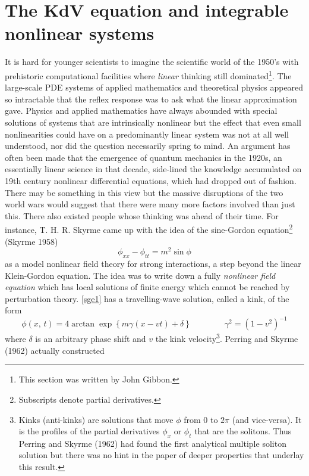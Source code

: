 \documentclass[11pt]{article}
\newcommand{\bel}{\begin{equation}\label}
\newcommand{\ee}{\end{equation}}
\begin{document}
\section{\large The KdV equation and integrable nonlinear systems}\label{sect:KdV}

It is hard for younger scientists to imagine the scientific world of the 1950's with prehistoric computational facilities 
where \textit{linear} thinking still dominated\footnote{This section was written by John Gibbon.}. The large-scale PDE 
systems of applied mathematics and theoretical physics appeared so intractable that the reflex response was to ask what 
the linear approximation gave. Physics and applied mathematics have always abounded with special solutions of systems 
that are intrinsically nonlinear but the effect that even small nonlinearities could have on a predominantly linear 
system was not at all well understood, nor did the question necessarily spring to mind.  An argument has often been 
made that the emergence of quantum mechanics in the 1920s, an essentially linear science in that decade, side-lined 
the knowledge accumulated on 19th century nonlinear differential equations, which had dropped out of fashion. There 
may be something in this view but the massive disruptions of the two world wars would 
suggest that there were many more factors involved than just this. There also existed people whose thinking was ahead of 
their time. For instance, T. H. R. Skyrme came up with the idea of the sine-Gordon equation\footnote{Subscripts denote 
partial derivatives.} (Skyrme 1958) 
\bel{sge1}
\phi_{xx} - \phi_{tt} = m^{2}\sin\phi
\ee
as a model nonlinear field theory for strong interactions, a step beyond the linear Klein-Gordon equation. The idea was 
to write down a fully \textit{nonlinear field equation} which has local solutions of finite energy which cannot be reached 
by perturbation theory. \eqref{sge1} has a travelling-wave solution, called a kink, of the form
\bel{sge2}
\phi (x,\,t) = 4\arctan \exp \left\{{m\gamma (x-vt)+\delta}\right\} \qquad\qquad \gamma ^{2}= (1-v^{2})^{-1}
\ee
where $\delta$ is an arbitrary phase shift and $v$ the kink velocity\footnote{Kinks (anti-kinks) are solutions that move 
$\phi$ from $0$ to $2\pi$ (and vice-versa). It is the profiles of the  partial derivatives $\phi_{x}$ or $\phi_{t}$ that 
are the solitons. Thus Perring and Skyrme (1962) had found the first analytical multiple soliton solution but there was 
no hint in the paper of deeper properties that underlay this result.}.  Perring and Skyrme (1962) actually constructed 
\end{document}
